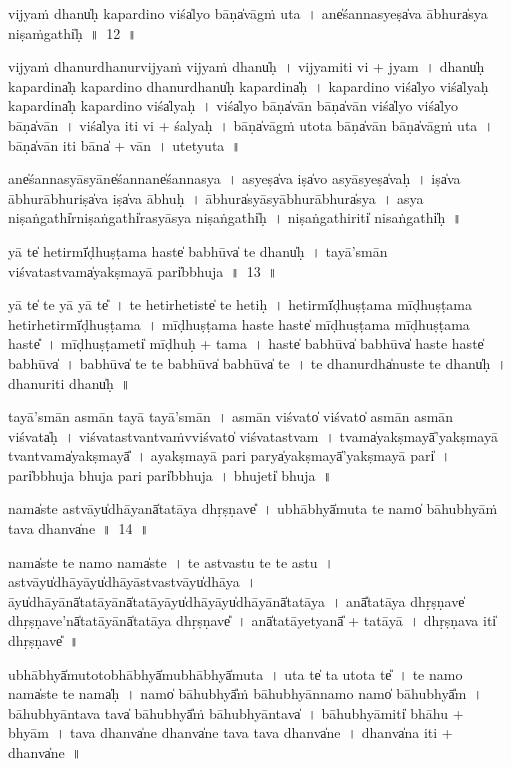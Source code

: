 \documentclass[parskip, DIV=14]{scrartcl}
\begin{document}
{\vspace{0.5cm}
vijya॒ṁ dhanu̍ḥ kapa॒rdino॒ viśa̍lyo॒ bāṇa̍vāgṁ u॒ta~।
ane̍śanna॒syeṣa̍va ā॒bhura̍sya niṣa॒ṁgathi̍ḥ~॥~12~॥

vijya॒ṁ dhanu॒rdhanu॒rvijya॒ṁ vijya॒ṁ dhanu̍ḥ~।
vijya॒miti॒ vi + jya॒m~।
dhanu̍ḥ kapa॒rdina̍ḥ kapa॒rdino॒ dhanu॒rdhanu̍ḥ kapa॒rdina̍ḥ~।
ka॒pa॒rdino॒ viśa̍lyo॒ viśa̍lyaḥ kapa॒rdina̍ḥ kapa॒rdino॒ viśa̍lyaḥ~।
viśa̍lyo॒ bāṇa̍vā॒n bāṇa̍vā॒n viśa̍lyo॒ viśa̍lyo॒ bāṇa̍vān~।
viśa̍lya॒ iti॒ vi + śa॒lya॒ḥ~।
bāṇa̍vāgṁ u॒tota bāṇa̍vā॒n bāṇa̍vāgṁ u॒ta~।
bāṇa̍vā॒n iti॒ bāna̍ + vā॒n॒~।
u॒tetyu॒ta~॥ 

ane̍śannasyā॒syāne̍śa॒nnane̍śannasya~।
a॒syeṣa̍va॒ iṣa̍vo asyā॒syeṣa̍vaḥ~।
iṣa̍va ā॒bhurā॒bhuriṣa̍va॒ iṣa̍va ā॒bhuḥ~।
ā॒bhura̍syāsyā॒bhurā॒bhura̍sya~।
a॒sya॒ ni॒ṣa॒ṅgathi̍rniṣa॒ṅgathi̍rasyāsya niṣa॒ṅgathi̍ḥ~।
ni॒ṣa॒ṅgathi॒riti̍ nisa॒ṅgathi̍ḥ~॥  %
 

\vspace{0.5cm}
yā te̍ he॒tirmī̍ḍhuṣṭama॒ haste̍ ba॒bhūva̍ te॒ dhanu̍ḥ~।
tayā॒'smān vi॒śvata॒stvama̍ya॒kṣmayā॒ pari̍bbhuja~॥~13~॥

yā te̍ te॒ yā yā te̎~।
te॒ he॒tirhe॒tiste̍ te he॒tiḥ~।
he॒tirmī̍ḍhuṣṭama mīḍhuṣṭama he॒tirhe॒tirmī̍ḍhuṣṭama~।
mī॒ḍhu॒ṣṭa॒ma॒ haste॒ haste̍ mīḍhuṣṭama mīḍhuṣṭama॒ haste̎~।
mī॒ḍhu॒ṣṭa॒meti̍ mīḍhuḥ + ta॒ma॒~।
haste̍ ba॒bhūva̍ ba॒bhūva̍ haste॒ haste̍ ba॒bhūva̍~।
ba॒bhūva̍ te te ba॒bhūva̍ ba॒bhūva̍ te~।
te॒ dhanu॒rdha̍nuste te॒ dhanu̍ḥ~।
dha॒nuriti॒ dhanu̍ḥ~॥ 

tayā॒'smān a॒smān tayā॒ tayā॒'smān~।
a॒smān vi॒śvato̍ vi॒śvato̍ asmān a॒smān vi॒śvata̍ḥ~।
vi॒śvata॒stvantvaṁvvi॒śvato̍ vi॒śvata॒stvam~।
tvama̍ya॒kṣmayā̍'ya॒kṣmayā॒ tvantvama̍ya॒kṣmayā̎~।
a॒ya॒kṣmayā॒ pari॒ parya̍ya॒kṣmayā̍'ya॒kṣmayā॒ pari̍~।
pari̍bbhuja bhuja॒ pari॒ pari̍bbhuja~।
bhu॒jeti̍ bhuja~॥ 

\vspace{0.5cm}
nama̍ste a॒stvāyu̍dhā॒yanā̍tatāya dhṛ॒ṣṇave̎~।
u॒bhābhyā̍mu॒ta te॒ namo̍ bā॒hubhyā॒ṁ tava॒ dhanva̍ne~॥~14~॥

nama̍ste te॒ namo॒ nama̍ste~।
te॒ a॒stva॒stu॒ te॒ te॒ a॒stu॒~।
a॒stvāyu̍dhā॒yāyu̍dhāyāstva॒stvāyu̍dhāya~।
āyu̍dhā॒yānā̍tatā॒yānā̍tatā॒yāyu̍dhā॒yāyu̍dhā॒yānā̍tatāya~।
anā̎tatāya dhṛ॒ṣṇave̍ dhṛ॒ṣṇave'nā̍tatā॒yānā̍tatāya dhṛ॒ṣṇave̎~।
anā̍tatā॒yetyanā̎ + ta॒tā॒yā॒~।
dhṛ॒ṣṇava iti̍  dhṛ॒ṣṇave̎~॥ 

u॒bhābhyā̍mu॒totobhābhyā̍mu॒bhābhyā̍mu॒ta~।
u॒ta te̍ ta u॒tota te̎~।
te॒ namo॒ nama̍ste te॒ nama̍ḥ~।
namo̍ bā॒hubhyā̎ṁ bā॒hubhyā॒nnamo॒ namo̍  bā॒hubhyā̎m~।
bā॒hubhyā॒ntava॒ tava̍ bā॒hubhyā̎ṁ bā॒hubhyā॒ntava̍~।
bā॒hubhyā॒miti̍ bhā॒hu + bhyā॒m~।
tava॒ dhanva̍ne॒ dhanva̍ne॒ tava॒ tava॒ dhanva̍ne~।
dhanva̍na॒ iti॒ + dhanva̍ne~॥ 


}
\end{document}
